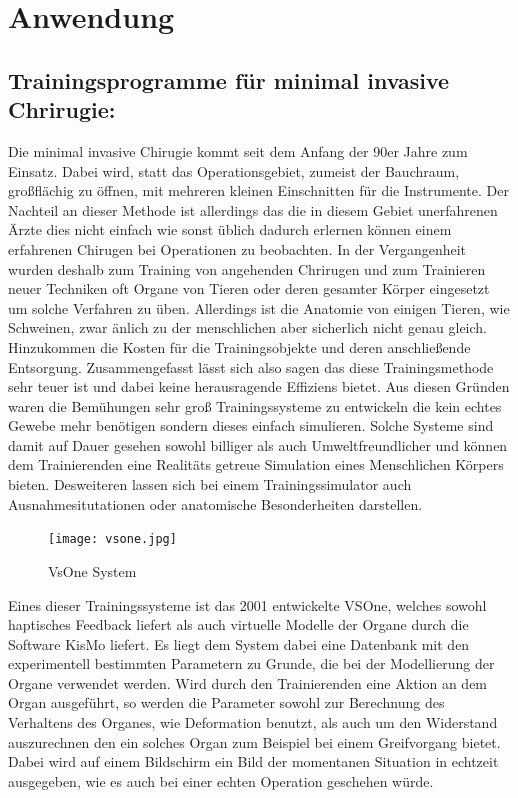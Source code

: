 \documentclass[11pt]{article}
\begin{document}
	\section{Anwendung}
		 
		\subsection{Trainingsprogramme für minimal invasive Chrirugie:}
			Die minimal invasive Chirugie kommt seit dem Anfang der 90er Jahre zum Einsatz. Dabei
			wird, statt das Operationsgebiet, zumeist der Bauchraum, großflächig zu öffnen, mit 
			mehreren kleinen Einschnitten für die Instrumente. Der Nachteil an dieser Methode ist 
			allerdings das die in diesem Gebiet unerfahrenen Ärzte dies nicht einfach wie sonst
			üblich dadurch erlernen können einem erfahrenen Chirugen bei Operationen zu beobachten.
			In der Vergangenheit wurden deshalb zum Training von angehenden Chrirugen 
			und zum Trainieren neuer Techniken oft Organe von Tieren oder deren gesamter Körper 
			eingesetzt um solche Verfahren zu üben. Allerdings ist die Anatomie von einigen 
			Tieren, wie Schweinen, zwar änlich zu der menschlichen aber sicherlich nicht genau 
			gleich. Hinzukommen die Kosten für die Trainingsobjekte und deren anschließende 
			Entsorgung. Zusammengefasst lässt sich also sagen das diese Trainingsmethode sehr 
			teuer ist und dabei keine herausragende Effiziens bietet. 
			Aus diesen Gründen waren die Bemühungen sehr groß Trainingssysteme zu entwickeln die 
			kein echtes Gewebe mehr benötigen sondern dieses einfach simulieren. Solche Systeme 
			sind damit auf Dauer gesehen sowohl billiger als auch Umweltfreundlicher und können
			dem Trainierenden eine Realitäts getreue Simulation eines Menschlichen Körpers bieten.
			Desweiteren lassen sich bei einem Trainingssimulator auch Ausnahmesitutationen oder
			anatomische Besonderheiten darstellen.
			
			\begin{figure}[h!]
			  \centering
				\texttt{[image: vsone.jpg]}
				\caption{VsOne System}
			\end{figure} 
			Eines dieser Trainingssysteme ist das 2001 entwickelte VSOne, welches sowohl haptisches 
			Feedback liefert als 
			auch virtuelle Modelle der Organe durch die Software KisMo liefert. Es liegt dem 
			System dabei eine Datenbank mit den experimentell bestimmten Parametern zu Grunde, die 
			bei der Modellierung der Organe verwendet werden. Wird durch den Trainierenden eine 
			Aktion an dem Organ ausgeführt, so werden die Parameter sowohl zur Berechnung des 
			Verhaltens des Organes, wie Deformation benutzt, als auch um den Widerstand 
			auszurechnen den ein solches Organ zum Beispiel bei einem Greifvorgang bietet.
			Dabei wird auf einem Bildschirm ein Bild der momentanen Situation in echtzeit 
			ausgegeben, wie es auch bei einer echten Operation geschehen würde.
			
\end{document}
